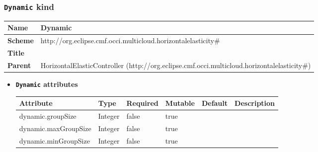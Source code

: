 \subsubsection{\texttt{Dynamic} kind}
\begin{center}
\begin{tabular}{|l|l|}
  \hline
  \textbf{Name} & Dynamic \\
  \hline  
  \textbf{Scheme} & http://org.eclipse.cmf.occi.multicloud.horizontalelasticity\# \\
  \hline
  \textbf{Title} &  \\
  \hline
  \textbf{Parent} & HorizontalElasticController (http://org.eclipse.cmf.occi.multicloud.horizontalelasticity\#) \\
  \hline
\end{tabular}
\end{center}
\begin{itemize}
\item \textbf{\texttt{Dynamic} attributes}

\begin{tabularx}{\textwidth}{|l|l|p{1.4cm}|p{1.3cm}|l|X|}
  \hline
  \textbf{Attribute} & \textbf{Type} & \textbf{Required} & \textbf{Mutable} & \textbf{Default} & \textbf{Description} \\
  \hline  
  dynamic.groupSize & Integer & false & true &  &  \\
  \hline
  dynamic.maxGroupSize & Integer & false & true &  &  \\
  \hline
  dynamic.minGroupSize & Integer & false & true &  &  \\
  \hline
\end{tabularx}
\end{itemize}



